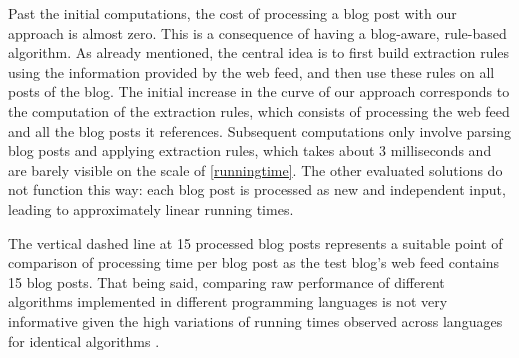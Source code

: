 Past the initial computations, the cost of processing a blog post with our approach is almost zero. This is a consequence of having a blog-aware, rule-based algorithm. As already mentioned, the central idea is to first build extraction rules using the information provided by the web feed, and then use these rules on all posts of the blog. The initial increase in the curve of our approach corresponds to the computation of the extraction rules, which consists of processing the web feed and all the blog posts it references. Subsequent computations only involve parsing blog posts and applying extraction rules, which takes about 3 milliseconds and are barely visible on the scale of \autoref{runningtime}. The other evaluated solutions do not function this way: each blog post is processed as new and independent input, leading to approximately linear running times.

The vertical dashed line at 15 processed blog posts represents a suitable point of comparison of processing time per blog post as the test blog's web feed contains 15 blog posts. That being said, comparing raw performance of different algorithms implemented in different programming languages is not very informative given the high variations of running times observed across languages for identical algorithms \cite{hundt2011}.






